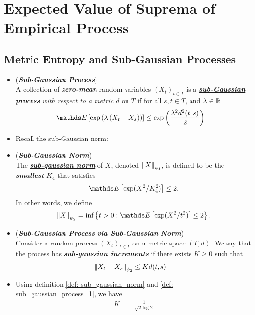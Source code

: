 \documentclass[11pt]{article}
\begin{document}
\section{Expected Value of Suprema of Empirical Process}
\subsection{Metric Entropy and Sub-Gaussian Processes}
\begin{itemize}
\item \begin{definition} (\textbf{\emph{Sub-Gaussian Process}})  \citep{wainwright2019high}\\
A collection of \emph{\textbf{zero-mean}} random variables $(X_t)_{t\in T}$ is a \underline{\emph{\textbf{sub-Gaussian process}}} \emph{with respect to a metric} $d$ on $T$ if for all $s, t \in T$, and $\lambda \in {\mathbb R}$
\begin{align}
\E{}{\exp\paren{\lambda\paren{X_t - X_{s}}}} &\le \exp\paren{\frac{\lambda^2 d^2(t, s) }{2}} \label{def: sub_gaussian_process_1}
\end{align}
\end{definition}

\item Recall the sub-Gaussian norm:
\item \begin{definition} (\textbf{\emph{Sub-Gaussian Norm}}) \\
The \underline{\emph{\textbf{sub-gaussian norm}}} of $X$, denoted $\left\|X\right\|_{\psi_2}$, is defined
to be the \emph{\textbf{smallest}} $K_4$ that satisfies 
\begin{align*}
\E{}{\exp(X^2 / K_4^2)} \le 2.
\end{align*} In other words, we define
\begin{align}
\norm{X}{\psi_2}= \inf\set{t > 0: \E{}{\exp(X^2 / t^2)} \le 2}.  \label{def: sub_gaussian_norm}
\end{align}
\end{definition}

\item \begin{definition}(\textbf{\emph{Sub-Gaussian Process via Sub-Gaussian Norm}})  \citep{vershynin2018high}\\
Consider a random process $(X_t)_{t\in T}$ on a metric space $(T, d)$. We say that the process has \underline{\emph{\textbf{sub-gaussian increments}}} if
there exists $K \ge 0$ such that
\begin{align}
\left\|X_t - X_{s}\right\|_{\psi_2} &\le K d(t, s)  \label{def: sub_gaussian_process_2}
\end{align}
\end{definition}

\item \begin{remark}
Using definition \eqref{def: sub_gaussian_norm} and \eqref{def: sub_gaussian_process_1}, we have
\begin{align*}
K &= \frac{1}{\sqrt{2 \log 2}}
\end{align*}
\end{remark}

\end{itemize}
\end{document}
